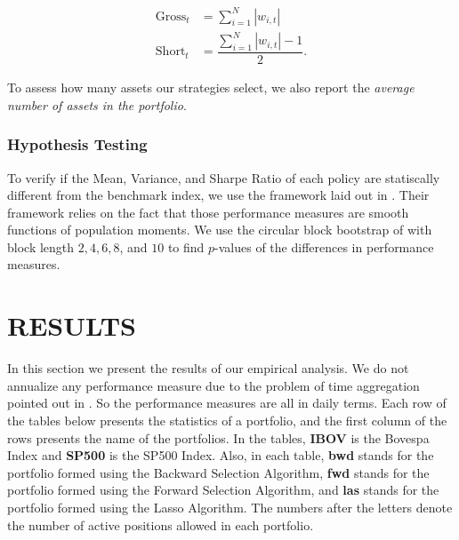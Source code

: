 \documentclass[12pt,oneside,a4paper]{memoir}
\begin{document}
\vspace{-18 pt}
\begin{align*}
\label{gross}
\text{Gross}_{t} &= \sum_{i=1}^{N} |w_{i,t}|
\\
\label{short}
\text{Short}_{t} &= \dfrac{\sum_{i=1}^{N} |w_{i,t}| - 1}{2}.
\end{align*}

To assess how many assets our strategies select, we also report the \textit{average number of assets in the portfolio}.

\subsubsection*{Hypothesis Testing}

To verify if the Mean, Variance, and Sharpe Ratio of each policy are statiscally different from the benchmark index, we use the framework laid out in .
Their framework relies on the fact that those performance measures are smooth functions of population moments.
We use the circular block bootstrap of  with block length $2, 4, 6, 8$, and $10$ to find $p$-values of the differences in performance measures.


\section{RESULTS} \label{sec:results:it}

In this section we present the results of our empirical analysis.
We do not annualize any performance measure due to the problem of time aggregation pointed out in .
So the performance measures are all in daily terms.
Each row of the tables below presents the statistics of a portfolio, and the first column of the rows presents the name of the portfolios.
In the tables, \textbf{IBOV} is the Bovespa Index and \textbf{SP500} is the SP500 Index. 
Also, in each table,
\textbf{bwd} stands for the portfolio formed using the Backward Selection Algorithm, 
\textbf{fwd} stands for the portfolio formed using the Forward Selection Algorithm, and
\textbf{las} stands for the portfolio formed using the Lasso Algorithm.
The numbers after the letters denote the number of active positions allowed in each portfolio.

\end{document}
